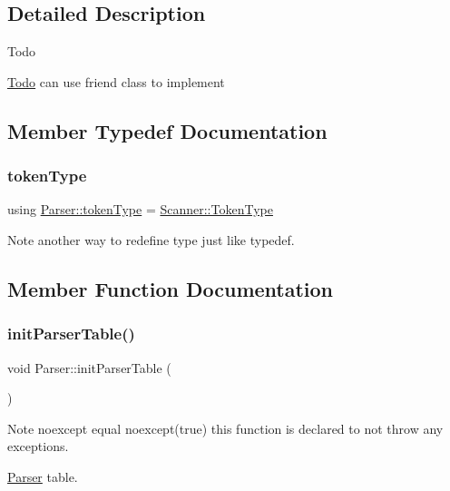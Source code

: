 \subsection{Detailed Description}
\begin{DoxyRefDesc}{Todo}
\item[\hyperlink{todo__todo000004}{Todo}]can use friend class to implement \end{DoxyRefDesc}


\subsection{Member Typedef Documentation}
\hypertarget{class_parser_afff32ed1fe75105bdb39638ab79fbf32}{}\label{class_parser_afff32ed1fe75105bdb39638ab79fbf32} 
\subsubsection{\texorpdfstring{token\+Type}{tokenType}}
{\footnotesize\ttfamily using \hyperlink{class_scanner_a1d588ca5cfd26bdff0e59b437da5b166}{Parser\+::token\+Type} =  \hyperlink{class_scanner_a1d588ca5cfd26bdff0e59b437da5b166}{Scanner\+::\+Token\+Type}}

\begin{DoxyNote}{Note}
another way to redefine type just like typedef. 
\end{DoxyNote}


\subsection{Member Function Documentation}
\hypertarget{class_parser_a49977242eb4dcb3ce4909d5ffbe2a813}{}\label{class_parser_a49977242eb4dcb3ce4909d5ffbe2a813} 
\subsubsection{\texorpdfstring{init\+Parser\+Table()}{initParserTable()}}
{\footnotesize\ttfamily void Parser\+::init\+Parser\+Table (\begin{DoxyParamCaption}{ }\end{DoxyParamCaption})\hspace{0.3cm}{\ttfamily [noexcept]}}

\begin{DoxyNote}{Note}
noexcept equal noexcept(true) this function is declared to not throw any exceptions. 
\end{DoxyNote}
\hyperlink{class_parser}{Parser} table.

